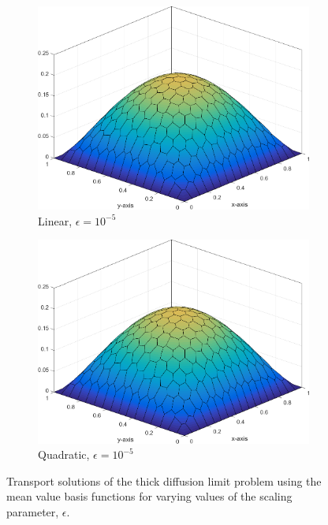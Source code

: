\begin{figure}
{\begin{subfigure}[b]{0.465\textwidth}
		\centering
		\label{subfig::DL_trans_mv1_e5}
		\includegraphics[width=\textwidth]{figures/sec_BF/Sq_poly_MV_k=1_ep=1e-5.png}
		\caption{Linear, $\epsilon = 10^{-5}$}
	\end{subfigure}
	\hfill
	\begin{subfigure}[b]{0.465\textwidth}
		\centering
		\label{subfig::DL_trans_mv2_e5}
		\includegraphics[width=\textwidth]{figures/sec_BF/Sq_poly_MV_k=2_ep=1e-5.png}
		\caption{Quadratic, $\epsilon = 10^{-5}$}
	\end{subfigure}
}
\caption{Transport solutions of the thick diffusion limit problem using the mean value basis functions for varying values of the scaling parameter, $\epsilon$.}
\label{fig::BF_Results_DL_MV}
\end{figure}

